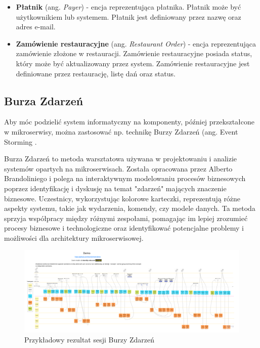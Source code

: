 \begin{itemize}
    \item \textbf{Płatnik} (ang. \textit{Payer}) - encja reprezentująca płatnika. Płatnik może być użytkownikiem lub systemem. Płatnik jest definiowany przez nazwę oraz adres e-mail.
    \item \textbf{Zamówienie restauracyjne} (ang. \textit{Restaurant Order}) - encja reprezentująca zamówienie złożone w restauracji. Zamówienie restauracyjne posiada status, który może być aktualizowany przez system. Zamówienie restauracyjne jest definiowane przez restaurację, listę dań oraz status.

\end{itemize}

\subsection{Burza Zdarzeń}

Aby móc podzielić system informatyczny na komponenty, później przekształcone w mikroserwisy, można zastosować np. technikę Burzy Zdarzeń (ang. Event Storming \cite{eventstorming}.

Burza Zdarzeń to metoda warsztatowa używana w projektowaniu i analizie systemów opartych na mikroserwisach. Została opracowana przez Alberto Brandoliniego i polega na interaktywnym modelowaniu procesów biznesowych poprzez identyfikację i dyskusję na temat "zdarzeń" mających znaczenie biznesowe. Uczestnicy, wykorzystując kolorowe karteczki, reprezentują różne aspekty systemu, takie jak wydarzenia, komendy, czy modele danych. Ta metoda sprzyja współpracy między różnymi zespołami, pomagając im lepiej zrozumieć procesy biznesowe i technologiczne oraz identyfikować potencjalne problemy i możliwości dla architektury mikroserwisowej.

\begin{figure}[!h]
    \centering \includegraphics[width=1.0\linewidth]{event_storming.png}
    \caption{Przykładowy rezultat sesji Burzy Zdarzeń \cite{event_storming_rys}}
\end{figure}


